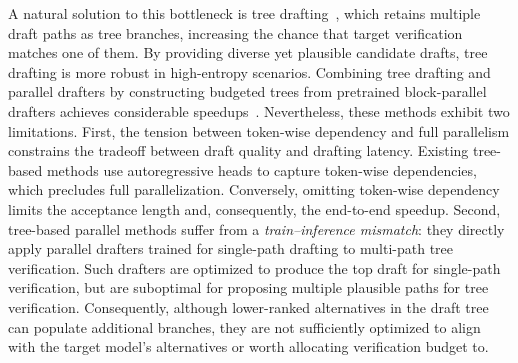 A natural solution to this bottleneck is tree drafting~\citep{miao2024specinfer,cai2024medusa,li2024eagle2}, which retains multiple draft paths as tree branches, increasing the chance that target verification matches one of them. By providing diverse yet plausible candidate drafts, tree drafting is more robust in high-entropy scenarios. Combining tree drafting and parallel drafters by constructing budgeted trees from pretrained block-parallel drafters achieves considerable speedups~\citep{ringel2026accelerating,li2026dartree}. Nevertheless, these methods exhibit two limitations. First, the tension between token-wise dependency and full parallelism constrains the tradeoff between draft quality and drafting latency. Existing tree-based methods use autoregressive heads to capture token-wise dependencies, which precludes full parallelization. Conversely, omitting token-wise dependency limits the acceptance length and, consequently, the end-to-end speedup. Second, tree-based parallel methods suffer from a \textit{train--inference mismatch}: they directly apply parallel drafters trained for single-path drafting to multi-path tree verification. Such drafters are optimized to produce the top draft for single-path verification, but are suboptimal for proposing multiple plausible paths for tree verification. Consequently, although lower-ranked alternatives in the draft tree can populate additional branches, they are not sufficiently optimized to align with the target model's alternatives or worth allocating verification budget to.

